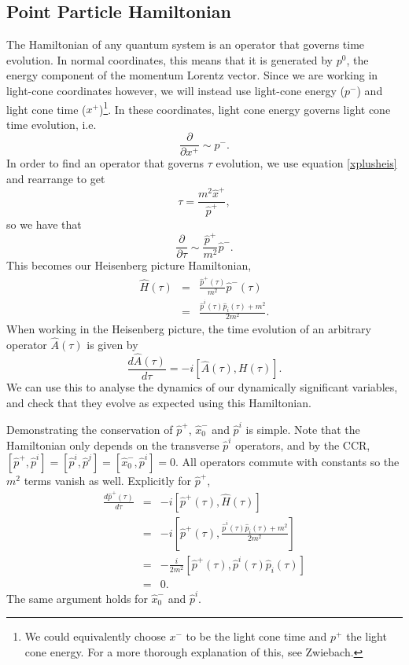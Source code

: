 \documentclass[a4paper,12pt]{article}
\numberwithin{equation}{section}
\begin{document}
\subsection{Point Particle Hamiltonian}
The Hamiltonian of any quantum system is an operator that governs time evolution. In normal coordinates, this means that it is generated by $p^0$, the energy component of the momentum Lorentz vector. Since we are working in light-cone coordinates however, we will instead use light-cone energy ($p^-$) and light cone time ($x^+$)\footnote{We could equivalently choose $x^-$ to be the light cone time and $p^+$ the light cone energy. For a more thorough explanation of this, see Zwiebach\cite{zwiebach}.}. In these coordinates, light cone energy governs light cone time evolution, i.e.
\begin{equation}
\frac{\partial}{\partial x^+} \sim p^-.
\end{equation}
In order to find an operator that governs $\tau$ evolution, we use equation \ref{xplusheis} and rearrange to get
\begin{equation}
\tau = \frac{m^2\hat{x}^+}{\hat{p}^+}, 
\end{equation}
so we have that
\begin{equation}
\frac{\partial}{\partial \tau} \sim \frac{\hat{p}^+}{m^2}\hat{p}^-.
\end{equation}
This becomes our Heisenberg picture Hamiltonian,
\begin{eqnarray}
\hat{H}(\tau) &=& \frac{\hat{p}^+(\tau)}{m^2}\hat{p}^-(\tau)\nonumber\\
&=& \frac{\hat{p}^i(\tau)\hat{p}_i(\tau)+ m^2}{2m^2}\label{pointhamiltonian}.
\end{eqnarray}
When working in the Heisenberg picture, the time evolution of an arbitrary operator $\hat{A}(\tau)$ is given by
\begin{equation}
\frac{d\hat{A}(\tau)}{d\tau} = -i[\hat{A}(\tau), H(\tau)].
\end{equation}
We can use this to analyse the dynamics of our dynamically significant variables, and check that they evolve as expected using this Hamiltonian.

Demonstrating the conservation of $\hat{p}^+$, $\hat{x}_0^-$ and $\hat{p}^i$ is simple. Note that the Hamiltonian only depends on the transverse $\hat{p}^i$ operators, and by the CCR, $[\hat{p}^+, \hat{p}^i] = [\hat{p}^i,\hat{p}^j] = [\hat{x}_0^-,\hat{p}^i] = 0$. All operators commute with constants so the $m^2$ terms vanish as well. Explicitly for $\hat{p}^+$,
\begin{eqnarray*}
\frac{d \hat{p}^+(\tau)}{d\tau} &=& -i[\hat{p}^+(\tau),\hat{H}(\tau)]\\
&=& -i\left[\hat{p}^+(\tau),\frac{\hat{p}^i(\tau)\hat{p}_i(\tau) + m^2}{2m^2}\right]\\
&=& -\frac{i}{2m^2}\left[\hat{p}^+(\tau),\hat{p}^i(\tau)\hat{p}_i(\tau) \right]\\
&=& 0.
\end{eqnarray*}
The same argument holds for $\hat{x}_0^-$ and $\hat{p}^i$.
\end{document}
